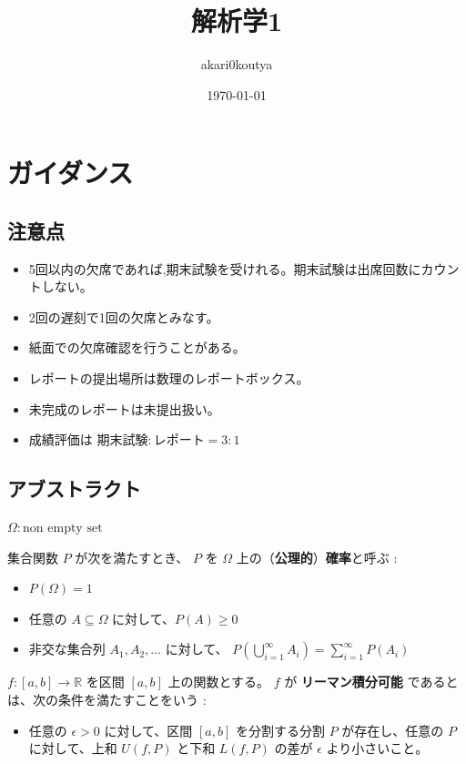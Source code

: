 \documentclass[article,paper=a4paper]{jlreq}
\title{解析学1}
\author{akari0koutya}
\date{\today}
\begin{document}
\maketitle
\tableofcontents

\section{ガイダンス}
\subsection{注意点}
\begin{itemize}
    \item 5回以内の欠席であれば,期末試験を受けれる。期末試験は出席回数にカウントしない。
    \item 2回の遅刻で1回の欠席とみなす。
    \item 紙面での欠席確認を行うことがある。
    \item レポートの提出場所は数理のレポートボックス。
    \item 未完成のレポートは未提出扱い。
    \item 成績評価は $\text{期末試験}:\text{レポート} = 3:1$
\end{itemize}

\subsection{アブストラクト}

\begin{tcolorbox}[colback=white,colframe=Turquoise4,,title=公理的確率の存在]
$\Omega : \text{non empty set}$ \par
集合関数 $P$ が次を満たすとき、 $P$ を $\Omega$ 上の（\textbf{公理的}）\textbf{確率}と呼ぶ :
\begin{itemize}
    \item $P(\Omega) = 1$
    \item 任意の $A \subseteq \Omega$ に対して、$P(A) \geq 0$ 
    \item 非交な集合列 $A_1, A_2, \ldots$ に対して、 $P\left( \bigcup_{i=1}^{\infty} A_i \right) = \sum_{i=1}^{\infty} P(A_i)$
\end{itemize}
\end{tcolorbox}

\begin{tcolorbox}[colback=white,colframe=Turquoise4,,title=リーマン積分]
$f \colon [a,b] \to \mathbb{R}$ を区間 $[a,b]$ 上の関数とする。 $f$ が \textbf{リーマン積分可能} であるとは、次の条件を満たすことをいう :
\begin{itemize}
    \item 任意の $\epsilon > 0$ に対して、区間 $[a,b]$ を分割する分割 $P$ が存在し、任意の $P$ に対して、上和 $U(f,P)$ と下和 $L(f,P)$ の差が $\epsilon$ より小さいこと。
\end{itemize}
\end{tcolorbox}
\end{document}
